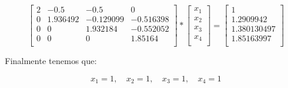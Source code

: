 \begin{enumerate}
    \[
        \begin{bmatrix}
            2 & -0.5 & -0.5 & 0\\
            0 & 1.936492 & -0.129099 & -0.516398\\
            0 & 0 & 1.932184 & -0.552052 \\
            0 & 0 & 0 & 1.85164\\
        \end{bmatrix} * 
        \begin{bmatrix}
            x_1\\ x_2\\ x_3\\ x_4\\
        \end{bmatrix} = 
        \begin{bmatrix}
            1 \\ 1.2909942 \\ 1.380130497 \\ 1.85163997 \\
        \end{bmatrix}
    \]
    
    Finalmente tenemos que:
    
    $$
    x_1 = 1, \quad x_2 = 1, \quad x_3 = 1, \quad x_4 = 1
    $$
    
    
\end{enumerate}

